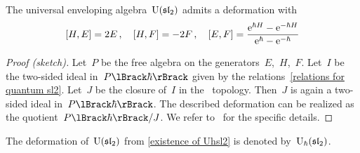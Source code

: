 \documentclass[a4paper, 11pt, oneside]{scrartcl}
\begin{document}
\begin{theorem}
  \label{existence of Uhsl2}
  The universal enveloping algebra~$\operatorname{U}(\mathfrak{sl}_2)$ admits a deformation with
  \begin{equation}
    \label{relations for quantum sl2}
    [H, E] = 2E \,,
    \quad
    [H, F] = -2F \,,
    \quad
    [E, F]
    =
    \frac{ \mathrm{e}^{\hbar H} - \mathrm{e}^{-\hbar H} }{ \mathrm{e}^{\hbar} - \mathrm{e}^{-\hbar} }
  \end{equation}
\end{theorem}

\begin{proof}[Proof (sketch)]
  Let~$P$ be the free algebra on the generators~$E$,~$H$,~$F$.
  Let~$I$ be the two-sided ideal in~$\power{P}{\hbar}$ given by the relations~\eqref{relations for quantum sl2}.
  Let~$J$ be the closure of~$I$ in the~\adic{$\hbar$} topology.
  Then~$J$ is again a two-sided ideal in~$\power{P}{\hbar}$.
  The described deformation can be realized as the quotient~$\power{P}{\hbar} / J$.
  We refer to~\cite[Definition-Proposition~6.4.3~ff.]{guide_to_quantum_groups} for the specific details.
\end{proof}

\begin{definition}
  The deformation of~$\operatorname{U}(\mathfrak{sl}_2)$ from \cref{existence of Uhsl2} is denoted by~$\operatorname{U}_{\hbar}(\mathfrak{sl}_2)$.
\end{definition}
\end{document}
